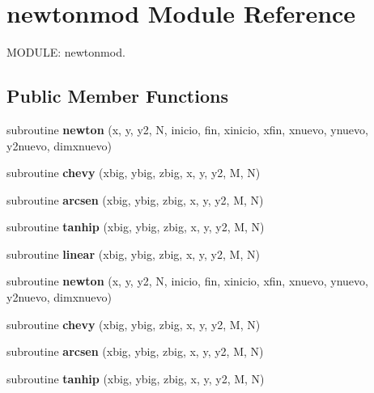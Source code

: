 \hypertarget{classnewtonmod}{\section{newtonmod Module Reference}
\label{classnewtonmod}
}


M\-O\-D\-U\-L\-E\-: newtonmod.  


\subsection*{Public Member Functions}
\begin{DoxyCompactItemize}
\item 
\hypertarget{classnewtonmod_a81456641848b6b0075c5cad5c06b419e}{subroutine {\bfseries newton} (x, y, y2, N, inicio, fin, xinicio, xfin, xnuevo, ynuevo, y2nuevo, dimxnuevo)}\label{classnewtonmod_a81456641848b6b0075c5cad5c06b419e}

\item 
\hypertarget{classnewtonmod_ab8b4784b9bfe0b972d47226fab52a0ce}{subroutine {\bfseries chevy} (xbig, ybig, zbig, x, y, y2, M, N)}\label{classnewtonmod_ab8b4784b9bfe0b972d47226fab52a0ce}

\item 
\hypertarget{classnewtonmod_a63e9e8d4a9aca35f85155a97fc08117e}{subroutine {\bfseries arcsen} (xbig, ybig, zbig, x, y, y2, M, N)}\label{classnewtonmod_a63e9e8d4a9aca35f85155a97fc08117e}

\item 
\hypertarget{classnewtonmod_ae2d7543098ee3b4d518e69a199646ea8}{subroutine {\bfseries tanhip} (xbig, ybig, zbig, x, y, y2, M, N)}\label{classnewtonmod_ae2d7543098ee3b4d518e69a199646ea8}

\item 
\hypertarget{classnewtonmod_acc9946e39a3c4ef2a4f21e21c7dc42b3}{subroutine {\bfseries linear} (xbig, ybig, zbig, x, y, y2, M, N)}\label{classnewtonmod_acc9946e39a3c4ef2a4f21e21c7dc42b3}

\item 
\hypertarget{classnewtonmod_a81456641848b6b0075c5cad5c06b419e}{subroutine {\bfseries newton} (x, y, y2, N, inicio, fin, xinicio, xfin, xnuevo, ynuevo, y2nuevo, dimxnuevo)}\label{classnewtonmod_a81456641848b6b0075c5cad5c06b419e}

\item 
\hypertarget{classnewtonmod_ab8b4784b9bfe0b972d47226fab52a0ce}{subroutine {\bfseries chevy} (xbig, ybig, zbig, x, y, y2, M, N)}\label{classnewtonmod_ab8b4784b9bfe0b972d47226fab52a0ce}

\item 
\hypertarget{classnewtonmod_a63e9e8d4a9aca35f85155a97fc08117e}{subroutine {\bfseries arcsen} (xbig, ybig, zbig, x, y, y2, M, N)}\label{classnewtonmod_a63e9e8d4a9aca35f85155a97fc08117e}

\item 
\hypertarget{classnewtonmod_ae2d7543098ee3b4d518e69a199646ea8}{subroutine {\bfseries tanhip} (xbig, ybig, zbig, x, y, y2, M, N)}\label{classnewtonmod_ae2d7543098ee3b4d518e69a199646ea8}

\end{DoxyCompactItemize}



